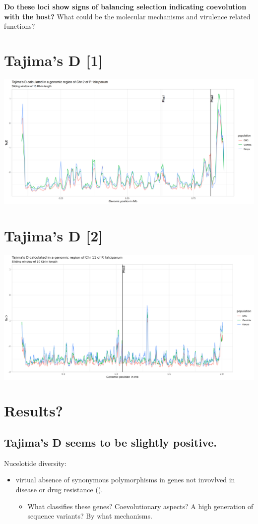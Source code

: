 \documentclass[11pt]{article}
\begin{document}
\textbf{Do these loci show signs of balancing selection indicating coevolution with the host?} What could be the molecular mechanisms and virulence related functions?

\section{Tajima's D [1]}
\label{sec:org183f418}
\begin{center}
\includegraphics[width=.9\linewidth]{./output/TajD/png/Pf7.chr2.full.TajD_DRC_GM_KE.png}
\end{center}

\section{Tajima's D [2]}
\label{sec:orgc2decba}
\begin{center}
\includegraphics[width=.9\linewidth]{./output/TajD/png/Pf7.chr11.full.TajD_DRC_GM_KE.png}
\end{center}

\section{Results?}
\label{sec:org45d3d53}
\subsection{Tajima's D seems to be slightly positive.}
\label{sec:org1fd1620}
Nucelotide diversity:
\begin{itemize}
\item virtual absence of synonymous polymorphisms in genes not invovlved in disease or drug resistance (\cite{rich-2000-popul-struc}).
\begin{itemize}
\item What classifies these genes? Coevolutionary aspects? A high generation of sequence variants? By what mechanisms.
\end{itemize}
\end{itemize}
\end{document}

